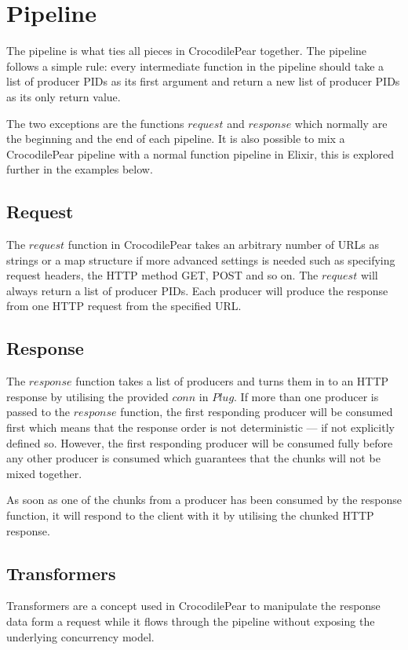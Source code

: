 \documentclass{cslthse-msc}
\begin{document}
\section{Pipeline}
The pipeline is what ties all pieces in CrocodilePear together. The pipeline follows a simple rule: every intermediate function in the pipeline should take a list of producer PIDs as its first argument and return a new list of producer PIDs as its only return value.

The two exceptions are the functions $request$ and $response$ which normally are the beginning and the end of each pipeline. It is also possible to mix a CrocodilePear pipeline with a normal function pipeline in Elixir, this is explored further in the examples below.

\subsection{Request}
The $request$ function in CrocodilePear takes an arbitrary number of URLs as strings or a map structure if more advanced settings is needed such as specifying request headers, the HTTP method GET, POST and so on. The $request$ will always return a list of producer PIDs. Each producer will produce the response from one HTTP request from the specified URL.

\subsection{Response}
The $response$ function takes a list of producers and turns them in to an HTTP response by utilising the provided $conn$ in $Plug$. If more than one producer is passed to the $response$ function, the first responding producer will be consumed first which means that the response order is not deterministic --- if not explicitly defined so. However, the first responding producer will be consumed fully before any other producer is consumed which guarantees that the chunks will not be mixed together.

As soon as one of the chunks from a producer has been consumed by the response function, it will respond to the client with it by utilising the chunked HTTP response.

\subsection{Transformers}
Transformers are a concept used in CrocodilePear to manipulate the response data form a request while it flows through the pipeline without exposing the underlying concurrency model.
\end{document}
